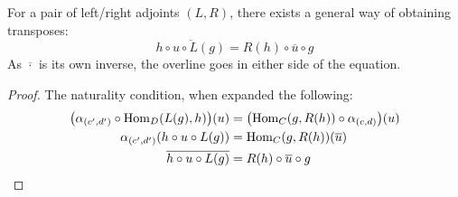 \begin{theorem}
  For a pair of left/right adjoints $(L, R)$, there exists a general way of
  obtaining transposes:
  \[
    \overline{h\circ u \circ L(g)} = R(h) \circ \overline{u} \circ g
  \]
  As $\overline{\cdot}$ is its own inverse, the overline goes in either side of
  the equation.
  \begin{proof}
    The naturality condition, when expanded the following:
    \[
      \begin{aligned}
      \big(\alpha_{(c', d')} \circ \mathrm{Hom}_D(L(g), h)\big)(u)
        &= \big(\mathrm{Hom}_C(g, R(h)) \circ \alpha_{(c, d)}\big)(u)\\
      \alpha_{(c', d')}(h\circ u \circ L(g))
        &= \mathrm{Hom}_C(g, R(h))(\overline{u})\\
      \overline{h\circ u \circ L(g)}
        &= R(h) \circ \overline{u} \circ g
      \end{aligned}
    \]
  \end{proof}
\end{theorem}

